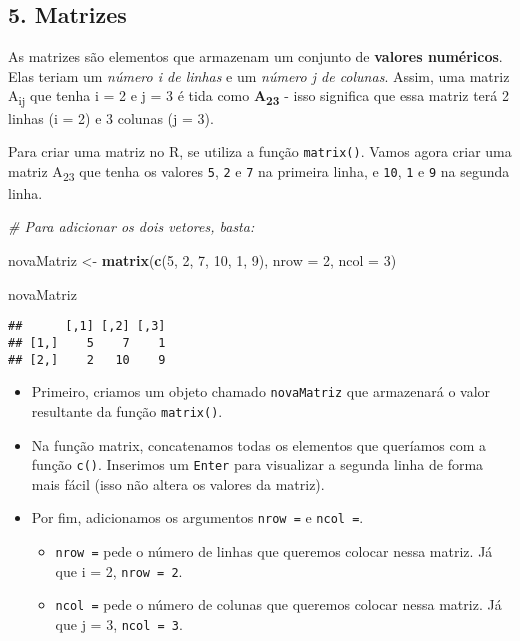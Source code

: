 \documentclass[
]{article}
\newenvironment{Shaded}{\begin{snugshade}}{\end{snugshade}}
\newcommand{\CommentTok}[1]{\textcolor[rgb]{0.56,0.35,0.01}{\textit{#1}}}
\newcommand{\DataTypeTok}[1]{\textcolor[rgb]{0.13,0.29,0.53}{#1}}
\newcommand{\DecValTok}[1]{\textcolor[rgb]{0.00,0.00,0.81}{#1}}
\newcommand{\KeywordTok}[1]{\textcolor[rgb]{0.13,0.29,0.53}{\textbf{#1}}}
\newcommand{\NormalTok}[1]{#1}
\newcommand{\StringTok}[1]{\textcolor[rgb]{0.31,0.60,0.02}{#1}}
\providecommand{\tightlist}{%
  \setlength{\itemsep}{0pt}\setlength{\parskip}{0pt}}
\begin{document}
\hypertarget{matrizes}{%
\subsection{5. Matrizes}\label{matrizes}}

As matrizes são elementos que armazenam um conjunto de \textbf{valores
numéricos}. Elas teriam um \emph{número i de linhas} e um \emph{número j
de colunas}. Assim, uma matriz A\textsubscript{ij} que tenha i = 2 e j =
3 é tida como \textbf{A\textsubscript{23}} - isso significa que essa
matriz terá 2 linhas (i = 2) e 3 colunas (j = 3).

Para criar uma matriz no R, se utiliza a função \texttt{matrix()}. Vamos
agora criar uma matriz A\textsubscript{23} que tenha os valores
\texttt{5}, \texttt{2} e \texttt{7} na primeira linha, e \texttt{10},
\texttt{1} e \texttt{9} na segunda linha.

\begin{Shaded}
\begin{Highlighting}[]
\CommentTok{# Para adicionar os dois vetores, basta:}

\NormalTok{novaMatriz <-}\StringTok{ }\KeywordTok{matrix}\NormalTok{(}\KeywordTok{c}\NormalTok{(}\DecValTok{5}\NormalTok{, }\DecValTok{2}\NormalTok{, }\DecValTok{7}\NormalTok{,}
                       \DecValTok{10}\NormalTok{, }\DecValTok{1}\NormalTok{, }\DecValTok{9}\NormalTok{), }\DataTypeTok{nrow =} \DecValTok{2}\NormalTok{, }\DataTypeTok{ncol =} \DecValTok{3}\NormalTok{)}

\NormalTok{novaMatriz}
\end{Highlighting}
\end{Shaded}

\begin{verbatim}
##      [,1] [,2] [,3]
## [1,]    5    7    1
## [2,]    2   10    9
\end{verbatim}

\begin{itemize}
\tightlist
\item
  Primeiro, criamos um objeto chamado \texttt{novaMatriz} que armazenará
  o valor resultante da função \texttt{matrix()}.
\item
  Na função matrix, concatenamos todas os elementos que queríamos com a
  função \texttt{c()}. Inserimos um \texttt{Enter} para visualizar a
  segunda linha de forma mais fácil (isso não altera os valores da
  matriz).
\item
  Por fim, adicionamos os argumentos \texttt{nrow\ =} e
  \texttt{ncol\ =}.

  \begin{itemize}
  \tightlist
  \item
    \texttt{nrow\ =} pede o número de linhas que queremos colocar nessa
    matriz. Já que i = 2, \texttt{nrow\ =\ 2}.
  \item
    \texttt{ncol\ =} pede o número de colunas que queremos colocar nessa
    matriz. Já que j = 3, \texttt{ncol\ =\ 3}.
  \end{itemize}
\end{itemize}
\end{document}
